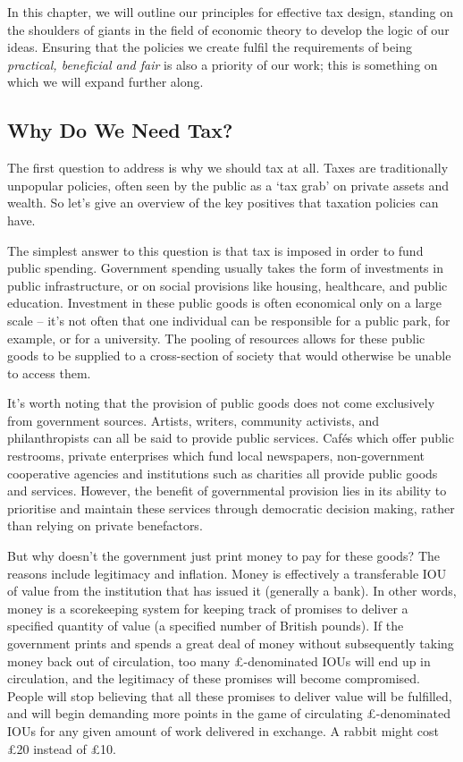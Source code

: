 \documentclass[]{tufte-handout}
\begin{document}
In this chapter, we will outline our principles for effective tax
design, standing on the shoulders of giants in the field of economic
theory to develop the logic of our ideas. Ensuring that the policies we
create fulfil the requirements of being \emph{practical, beneficial and
fair} is also a priority of our work; this is something on which we will
expand further along.

\hypertarget{why-do-we-need-tax}{%
\subsection{Why Do We Need Tax?}\label{why-do-we-need-tax}}

The first question to address is why we should tax at all. Taxes are
traditionally unpopular policies, often seen by the public as a `tax
grab' on private assets and wealth. So let's give an overview of the key
positives that taxation policies can have.

The simplest answer to this question is that tax is imposed in order to
fund public spending. Government spending usually takes the form of
investments in public infrastructure, or on social provisions like
housing, healthcare, and public education. Investment in these public
goods is often economical only on a large scale -- it's not often that
one individual can be responsible for a public park, for example, or for
a university. The pooling of resources allows for these public goods to
be supplied to a cross-section of society that would otherwise be unable
to access them.

It's worth noting that the provision of public goods does not come
exclusively from government sources. Artists, writers, community
activists, and philanthropists can all be said to provide public
services. Cafés which offer public restrooms, private enterprises which
fund local newspapers, non-government cooperative agencies and
institutions such as charities all provide public goods and services.
However, the benefit of governmental provision lies in its ability to
prioritise and maintain these services through democratic decision
making, rather than relying on private benefactors.

But why doesn't the government just print money to pay for these goods?
The reasons include legitimacy and inflation. Money is effectively a
transferable IOU of value from the institution that has issued it
(generally a bank). In other words, money is a scorekeeping system for
keeping track of promises to deliver a specified quantity of value (a
specified number of British pounds). If the government prints and spends
a great deal of money without subsequently taking money back out of
circulation, too many £-denominated IOUs will end up in circulation, and
the legitimacy of these promises will become compromised. People will
stop believing that all these promises to deliver value will be
fulfilled, and will begin demanding more points in the game of
circulating £-denominated IOUs for any given amount of work delivered in
exchange. A rabbit might cost £20 instead of £10.
\end{document}
